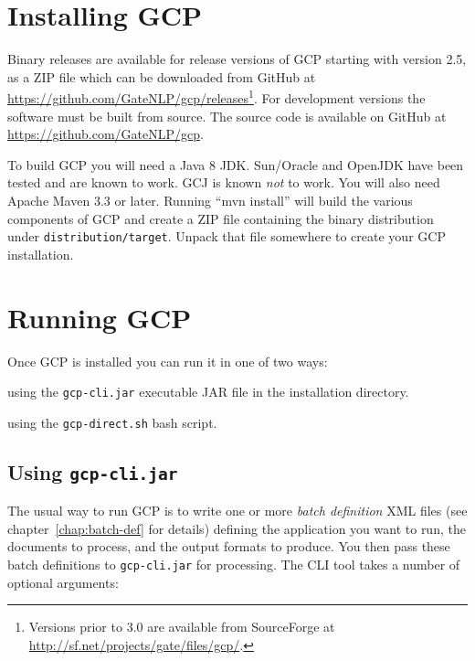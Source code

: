 \section{Installing GCP}

Binary releases are available for release versions of GCP starting with
version 2.5, as a ZIP file which can be downloaded from
GitHub at \url{https://github.com/GateNLP/gcp/releases}\footnote{Versions
prior to 3.0 are available from SourceForge at
\url{http://sf.net/projects/gate/files/gcp/}.}.  For development versions the
software must be built from source.  The source code is available on GitHub
at \url{https://github.com/GateNLP/gcp}.

To build GCP you will need a Java 8 JDK.  Sun/Oracle and OpenJDK have been
tested and are known to work.  GCJ is known {\em not} to work.  You will also
need Apache Maven 3.3 or later.  Running ``mvn install'' will build the various
components of GCP and create a ZIP file containing the binary distribution
under \verb!distribution/target!.  Unpack that file somewhere to create your
GCP installation.

\section{Running GCP}

Once GCP is installed you can run it in one of two ways:
\bit
\item using the \verb!gcp-cli.jar! executable
JAR file in the installation directory.
\item using the \verb!gcp-direct.sh! bash script.
\eit

\subsection{Using {\tt gcp-cli.jar}}

The usual way to run GCP is to write one or more {\em batch definition} XML
files (see chapter~\ref{chap:batch-def} for details) defining the application
you want to run, the documents to process, and the output formats to produce.
You then pass these batch definitions to \verb!gcp-cli.jar! for processing.
The CLI tool takes a number of optional arguments:

